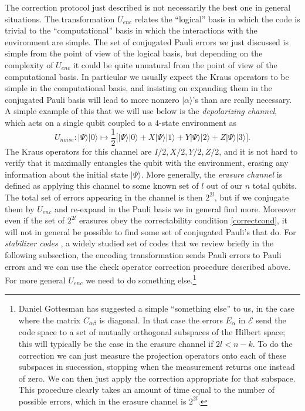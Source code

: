 \documentclass[12pt]{article}
\newcommand{\be}{\begin{equation}}
\newcommand{\ee}{\end{equation}}
\newcommand{\ran}{\rangle}
\begin{document}
The correction protocol just described is not necessarily the best one in general situations.  The transformation $U_{enc}$ relates the ``logical'' basis in which the code is trivial to the ``computational'' basis in which the interactions with the environment are simple.  The set of conjugated Pauli errors we just discussed is simple from the point of view of the logical basis, but depending on the complexity of $U_{enc}$ it could be quite unnatural from the point of view of the computational basis.  In particular we usually expect the Kraus operators to be simple in the computational basis, and insisting on expanding them in the conjugated Pauli basis will lead to more nonzero $|\alpha\ran$'s than are really necessary.  A simple example of this that we will use below is the \textit{depolarizing channel}, which acts on a single qubit coupled to a $4$-state environment as
\be
U_{noise}:|\Psi\ran |0\ran\longmapsto \frac{1}{2}\Big[|\Psi\ran|0\ran+X|\Psi\ran|1\ran+Y|\Psi\ran|2\ran+Z|\Psi\ran|3\ran\Big].
\ee
The Kraus operators for this channel are $I/2,X/2,Y/2,Z/2$, and it is not hard to verify that it maximally entangles the qubit with the environment, erasing any information about the initial state $|\Psi\ran$.  More generally, the \textit{erasure channel} is defined as applying this channel to some known set of $l$ out of our $n$ total qubits.  The total set of errors appearing in the channel is then $2^{2l}$, but if we conjugate them by $U_{enc}$ and re-expand in the Pauli basis we in general find more.  Moreover even if the set of $2^{2l}$ erasures obey the correctability condition \eqref{correctcond}, it will not in general be possible to find some set of conjugated Pauli's that do.  For \textit{stabilizer codes} \cite{gottesman1997stabilizer}, a widely studied set of codes that we review briefly in the following subsection, the encoding transformation sends Pauli errors to Pauli errors and we can use the check operator correction procedure described above.  For more general $U_{enc}$ we need to do something else.\footnote{Daniel Gottesman has suggested a simple ``something else'' to us, in the case where the matrix $C_{\alpha\beta}$ is diagonal.  In that case the errors $E_\alpha$ in $\mathcal{E}$ send the code space to a set of mutually orthogonal subspaces of the Hilbert space; this will typically be the case in the erasure channel if $2l<n-k$.  To do the correction we can just measure the projection operators onto each of these subspaces in succession, stopping when the measurement returns one instead of zero.  We can then just apply the correction appropriate for that subspace.  This procedure clearly takes an amount of time equal to the number of possible errors, which in the erasure channel is $2^{2l}$.}   
\end{document}
